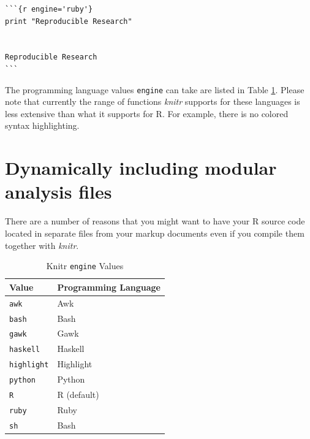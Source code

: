 \begin{knitrout}
\color{fgcolor}\begin{kframe}
\begin{verbatim}
```{r engine='ruby'}
print "Reproducible Research"
 

Reproducible Research
```
\end{verbatim}
\end{kframe}
\end{knitrout}

The programming language values \texttt{engine} can take are listed in Table \ref{EngineOptions}. Please note that currently the range of functions {\emph{knitr}} supports for these languages is less extensive than what it supports for R. For example, there is no colored syntax highlighting.

\section{Dynamically including modular analysis files}

There are a number of reasons that you might want to have your R source code located in separate files from your markup documents even if you compile them together with {\emph{knitr}}.

\begin{table}
    \caption{Knitr \texttt{engine} Values}
    \label{EngineOptions}
    \begin{tabular}{l p{2.25cm}}
    \hline\vspace{0.15cm}
    Value & Programming Language \\
    \hline\hline
    \texttt{awk} & Awk\index{Awk} \\
    \texttt{bash} & Bash\index{Bash} \\
    \texttt{gawk} & Gawk\index{Gawk} \\
    \texttt{haskell} & Haskell\index{Haskell} \\
    \texttt{highlight} & Highlight\index{Highlight, knitr engine option} \\ 
    \texttt{python} & Python\index{Python} \\
    \texttt{R} & R (default) \\[0.25cm]
    \texttt{ruby} & Ruby\index{Ruby} \\
    \texttt{sh} & Bash \\
    \hline
    \end{tabular}
\end{table}


